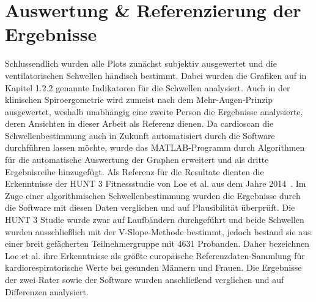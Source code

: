 \section{Auswertung \& Referenzierung der Ergebnisse}
%
Schlussendlich wurden alle Plots zunächst subjektiv ausgewertet und die ventilatorischen Schwellen händisch bestimmt. Dabei wurden die Grafiken auf in Kapitel 1.2.2 genannte Indikatoren für die Schwellen analysiert. Auch in der klinischen Spiroergometrie wird zumeist nach dem Mehr-Augen-Prinzip ausgewertet, weshalb unabhängig eine zweite Person die Ergebnisse analysierte, deren Ansichten in dieser Arbeit als Referenz dienen. Da cardioscan die Schwellenbestimmung auch in Zukunft automatisiert durch die Software durchführen lassen möchte, wurde das MATLAB-Programm durch Algorithmen für die automatische Auswertung der Graphen erweitert und als dritte Ergebnisreihe hinzugefügt. Als Referenz für die Resultate dienten die Erkenntnisse der HUNT 3 Fitnessstudie von Loe et al. aus dem Jahre 2014~\cite{Loe.2014}. Im Zuge einer algorithmischen Schwellenbestimmung wurden die Ergebnisse durch die Software mit diesen Daten verglichen und auf Plausibilität überprüft. Die HUNT 3 Studie wurde zwar auf Laufbändern durchgeführt und beide Schwellen wurden ausschließlich mit der V-Slope-Methode bestimmt, jedoch bestand sie aus einer breit gefächerten Teilnehmergruppe mit 4631 Probanden. Daher bezeichnen Loe et al. ihre Erkenntnisse als größte europäische Referenzdaten-Sammlung für kardiorespiratorische Werte bei gesunden Männern und Frauen. Die Ergebnisse der zwei Rater sowie der Software wurden anschließend verglichen und auf Differenzen analysiert.
%
